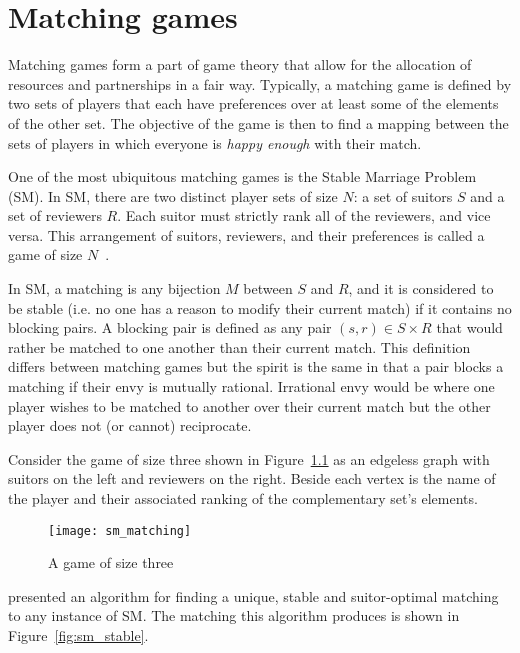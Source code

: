 \chapter{Matching games}
\label{chp:matching}

\graphicspath{{chapters/matching/paper/img/}}

Matching games form a part of game theory that allow for the allocation of
resources and partnerships in a fair way. Typically, a matching game is defined by two sets of players that each have
preferences over at least some of the elements of the other set. The objective
of the game is then to find a mapping between the sets of players in which
everyone is \emph{happy enough} with their match.

One of the most ubiquitous matching games is the Stable Marriage Problem
(SM). In SM, there are two distinct player sets of size \(N\): a set of suitors
\(S\) and a set of reviewers \(R\). Each suitor must strictly rank all of the
reviewers, and vice versa. This arrangement of suitors, reviewers, and
their preferences is called a game of size \(N\)~\cite{Gale1962}.

In SM, a matching is any bijection \(M\) between \(S\) and \(R\), and it is
considered to be stable (i.e. no one has a reason to modify their current match)
if it contains no blocking pairs. A blocking pair is defined as any pair \((s,
r) \in S \times R\) that would rather be matched to one another than their
current match. This definition differs between matching games but the spirit is
the same in that a pair blocks a matching if their envy is mutually rational.
Irrational envy would be where one player wishes to be matched to another over
their current match but the other player does not (or cannot) reciprocate.

Consider the game of size three shown in Figure~\ref{fig:sm_matching} as an
edgeless graph with suitors on the left and reviewers on the right. Beside each
vertex is the name of the player and their associated ranking of the
complementary set’s elements.

\begin{figure}
    \centering
    \texttt{[image: sm\_matching]}
    \caption{A game of size three}\label{fig:sm_matching}
\end{figure}


\cite{Gale1962} presented an algorithm for finding a unique, stable and
suitor-optimal matching to any instance of SM. The matching this algorithm
produces is shown in Figure~\ref{fig:sm_stable}.

